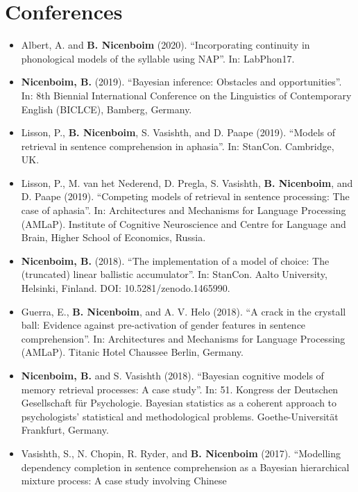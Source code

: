 \documentclass[]{article}
\begin{document}
\hypertarget{conferences}{%
\section{Conferences}\label{conferences}}

\begin{itemize}
\item
  Albert, A. and \textbf{B. Nicenboim} (2020). ``Incorporating
  continuity in phonological models of the syllable using NAP''. In:
  LabPhon17.
\item
  \textbf{Nicenboim, B.} (2019). ``Bayesian inference: Obstacles and
  opportunities''. In: 8th Biennial International Conference on the
  Linguistics of Contemporary English (BICLCE), Bamberg, Germany.
\item
  Lisson, P., \textbf{B. Nicenboim}, S. Vasishth, and D. Paape (2019).
  ``Models of retrieval in sentence comprehension in aphasia''. In:
  StanCon. Cambridge, UK.
\item
  Lisson, P., M. van het Nederend, D. Pregla, S. Vasishth, \textbf{B.
  Nicenboim}, and D. Paape (2019). ``Competing models of retrieval in
  sentence processing: The case of aphasia''. In: Architectures and
  Mechanisms for Language Processing (AMLaP). Institute of Cognitive
  Neuroscience and Centre for Language and Brain, Higher School of
  Economics, Russia.
\item
  \textbf{Nicenboim, B.} (2018). ``The implementation of a model of
  choice: The (truncated) linear ballistic accumulator''. In: StanCon.
  Aalto University, Helsinki, Finland. DOI: 10.5281/zenodo.1465990.
\item
  Guerra, E., \textbf{B. Nicenboim}, and A. V. Helo (2018). ``A crack in
  the crystall ball: Evidence against pre-activation of gender features
  in sentence comprehension''. In: Architectures and Mechanisms for
  Language Processing (AMLaP). Titanic Hotel Chaussee Berlin, Germany.
\item
  \textbf{Nicenboim, B.} and S. Vasishth (2018). ``Bayesian cognitive
  models of memory retrieval processes: A case study''. In: 51. Kongress
  der Deutschen Gesellschaft für Psychologie. Bayesian statistics as a
  coherent approach to psychologists' statistical and methodological
  problems. Goethe-Universität Frankfurt, Germany.
\item
  Vasishth, S., N. Chopin, R. Ryder, and \textbf{B. Nicenboim} (2017).
  ``Modelling dependency completion in sentence comprehension as a
  Bayesian hierarchical mixture process: A case study involving Chinese

\end{itemize}
\end{document}
